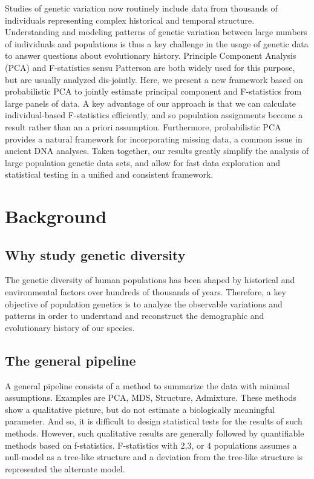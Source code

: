 \documentclass[12pt, letterpaper]{article}
\begin{document}
Studies of genetic variation now routinely include data from thousands of individuals representing complex historical and temporal structure. Understanding and modeling patterns of genetic variation between large numbers of individuals and populations is thus a key challenge in the usage of genetic data to answer questions about evolutionary history. 
Principle Component Analysis (PCA) and F-statistics sensu Patterson are both widely used for this purpose, but are usually analyzed dis-jointly. Here, we present a new framework based on 
probabilistic PCA to jointly estimate principal component and F-statistics from large panels of data. A key advantage of our approach is that we can calculate individual-based F-statistics efficiently, and so population assignments become a result rather than an a priori assumption. Furthermore, probabilistic PCA provides a natural framework for incorporating missing data, a common issue in ancient DNA analyses. Taken together, our results greatly simplify the analysis of large population genetic data sets, and allow for fast data exploration and statistical testing in a unified and consistent framework.

\section{Background}

\subsection{Why study genetic diversity}
The genetic diversity of human populations has been shaped by historical and environmental factors over hundreds of thousands of years. Therefore, a key objective of population genetics is to analyze the observable variations and patterns in order to understand and reconstruct the demographic and evolutionary history of our species. 

\subsection{The general pipeline}

A general pipeline consists of a method to summarize the data with minimal assumptions. Examples are PCA, MDS, Structure, Admixture. These methods show a qualitative picture, but do not estimate a biologically meaningful parameter. And so, it is difficult to design statistical tests for the results of such methods. However, such qualitative results are generally followed by quantifiable methods based on f-statistics. F-statistics with 2,3, or 4 populations assumes a null-model as a tree-like structure and a deviation from the tree-like structure is represented the alternate model.
\end{document}
